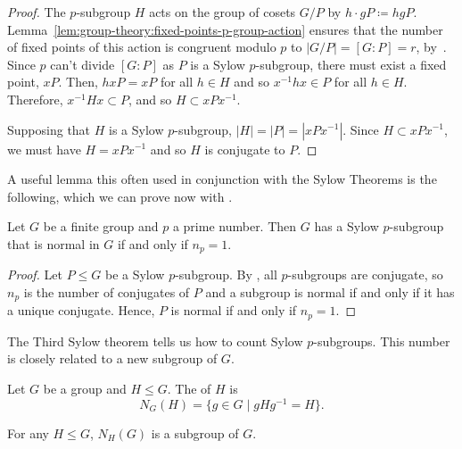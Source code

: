 \begin{proof}
  The \(p\)-subgroup \(H\) acts on the group of cosets \(G/P\) by \(h \cdot gP \coloneqq hgP\). Lemma~\ref{lem:group-theory:fixed-points-p-group-action} ensures that the number of fixed points of this action is congruent modulo \(p\) to \(|G/P| = [G : P] = r\), by~. Since \(p\) can't divide \([G : P]\) as \(P\) is a Sylow \(p\)-subgroup, there must exist a fixed point, \(xP\). Then, \(hxP = xP\) for all \(h \in H\) and so \(x^{-1}hx \in P\) for all \(h \in H\). Therefore, \(x^{-1}Hx \subset P\), and so \(H \subset xPx^{-1}\).

  Supposing that \(H\) is a Sylow \(p\)-subgroup, \(|H| = |P| = |xPx^{-1}|\). Since \(H \subset xPx^{-1}\), we must have \(H = xPx^{-1}\) and so \(H\) is conjugate to \(P\).
\end{proof}

A useful lemma this often used in conjunction with the Sylow Theorems is the following, which we can prove now with .

\begin{lemma}\label{lem:group-theory:p-group-normal-iff-np=1}
  Let \(G\) be a finite group and \(p\) a prime number. Then \(G\) has a Sylow \(p\)-subgroup that is normal in \(G\) if and only if \(n_{p} = 1\).
\end{lemma}

\begin{proof}
  Let \(P \leq G\) be a Sylow \(p\)-subgroup. By , all \(p\)-subgroups are conjugate, so \(n_{p}\) is the number of conjugates of \(P\) and a subgroup is normal if and only if it has a unique conjugate. Hence, \(P\) is normal if and only if \(n_{p} = 1\).
\end{proof}

The Third Sylow theorem tells us how to count Sylow \(p\)-subgroups. This number is closely related to a new subgroup of \(G\).

\begin{definition}\label{def:group-theory:normalizer}
  Let \(G\) be a group and \(H \leq G\). The  of \(H\) is
  \[N_{G}(H) = \{g \in G \mid gHg^{-1} = H\}.\]
\end{definition}

\begin{lemma}
  For any \(H \leq G\), \(N_{H}(G)\) is a subgroup of \(G\).
\end{lemma}

